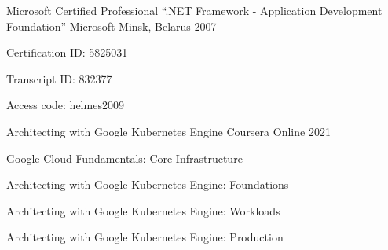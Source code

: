 

\begin{cventries}

  \cventry
   {Microsoft Certified Professional “.NET Framework - Application Development Foundation”} %
   {Microsoft} %
   {Minsk, Belarus} %
   {2007} %
   {
     \begin{cvitems} %
       \item {Certification ID: 5825031}
       \item {Transcript ID: 832377}
       \item {Access code: helmes2009}
     \end{cvitems}
   }

  \cventry
   {Architecting with Google Kubernetes Engine} %
   {Coursera} %
   {Online} %
   {2021} %
   {
     \begin{cvitems} %
       \item {Google Cloud Fundamentals: Core Infrastructure}
       \item {Architecting with Google Kubernetes Engine: Foundations}
       \item {Architecting with Google Kubernetes Engine: Workloads}
       \item {Architecting with Google Kubernetes Engine: Production}
     \end{cvitems}
   }

\end{cventries}
